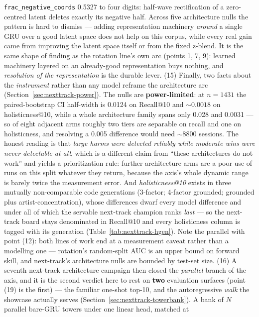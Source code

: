 \documentclass[11pt]{article}
\begin{document}
\texttt{frac\_negative\_coords} \num{0.5327} to four digits: half-wave
rectification of a zero-centred latent deletes exactly its negative half. Across
five architecture nulls the pattern is hard to dismiss --- adding representation
machinery \emph{around} a single GRU over a good latent space does not help on
this corpus, while every real gain came from improving the latent space itself or
from the fixed z-blend. It is the same shape of finding as the rotation line's
own arc (points 1, 7, 9): learned machinery layered on an already-good
representation buys nothing, and \emph{resolution of the representation} is the
durable lever.
(15) Finally, two facts about the \emph{instrument} rather than any model reframe
the architecture arc (Section~\ref{sec:nexttrack-power}). The nulls are
\textbf{power-limited}: at $n=\num{1431}$ the paired-bootstrap CI half-width is
\num{0.0124} on Recall@10 and ${\sim}\num{0.0018}$ on holisticness@10, while a
whole architecture family spans only \num{0.028} and \num{0.0031} --- so of eight
adjacent arms roughly two tiers are separable on recall and one on holisticness,
and resolving a \num{0.005} difference would need ${\sim}\num{8800}$ sessions.
The honest reading is that \emph{large harms were detected reliably while
moderate wins were never detectable at all}, which is a different claim from
``these architectures do not work'' and yields a prioritization rule: further
architecture arms are a poor use of runs on this split whatever they return,
because the axis's whole dynamic range is barely twice the measurement error.
And \emph{holisticness@10} exists in three mutually non-comparable code
generations (3-factor; 4-factor grounded; grounded plus artist-concentration),
whose differences dwarf every model difference and under all of which the
servable next-track champion ranks \emph{last} --- so the next-track board stays
denominated in Recall@10 and every holisticness column is tagged with its
generation (Table~\ref{tab:nexttrack-hgen}). Note the parallel with point (12):
both lines of work end at a measurement caveat rather than a modelling one ---
rotation's random-split AUC is an upper bound on forward skill, and next-track's
architecture nulls are bounded by test-set size.
(16) A seventh next-track architecture campaign then closed the \emph{parallel}
branch of the axis, and it is the second verdict here to rest on \textbf{two}
evaluation surfaces (point (19) is the first) --- the familiar one-shot top-10,
and the autoregressive
\emph{walk} the showcase actually serves (Section~\ref{sec:nexttrack-towerbank}).
A bank of $N$ parallel bare-GRU towers under one linear head, matched at
\end{document}
